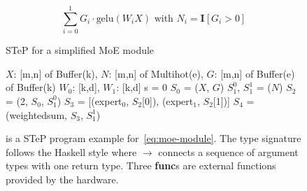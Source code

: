 \begin{figure}[htb]
\centering
\begin{equation}
    \sum_{i=0}^1 G_i \cdot \text{gelu}(W_i X) \text{ with } N_i = \mathbf{I}[G_i > 0]
\label{eq:moe-module}
\end{equation}
\setcounter{ALC@line}{0}
\begin{minipage}{0.5\textwidth}
\begin{algorithm}[H]
\caption{STeP for a simplified MoE module}
\label{alg:step-example-step}
\begin{algorithmic}[1]
\INPUT $X$: [m,n] of Buffer(k), $N$: [m,n] of Multihot(e), $G$: [m,n] of Buffer(e)
\OUTPUT [m,n] of Buffer(k)
\PARAM $W_0$: [k,d], $W_1$: [k,d]
\INIT s = 0
\STATE $S_0$ = ($X$, $G$)
\STATE $S_1^0$, $S_1^1$ = ($N$)
\STATE $S_2$ = (2, $S_0$, $S_1^0$)
\STATE $S_3$ = [(expert$_0$, $S_2$[0]), (expert$_1$, $S_2$[1])]
\STATE $S_4$ = (weightedsum, $S_3$, $S_1^1$)
\end{algorithmic}
\end{algorithm}
\end{minipage}
\caption{ is a STeP program example for~\cref{eq:moe-module}. The type signature follows the Haskell style where $\rightarrow$ connects a sequence of argument types with one return type. Three \textbf{func}s are external functions provided by the hardware.}
\label{fig:step-intro}
\end{figure}

